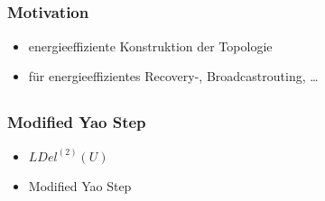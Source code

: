 \documentclass[compress]{beamer}
\begin{document}
\subsection{}
\begin{frame}
\frametitle{Motivation}
\begin{itemize}  %
	\item energieeffiziente Konstruktion der Topologie
	\item für energieeffizientes Recovery-, Broadcastrouting, \ldots
\end{itemize}
\end{frame}
\subsection{}
\begin{frame}
\frametitle{Modified Yao Step}
	\begin{itemize}
		\item $LDel^{(2)}(U) $
		\item Modified Yao Step 
	\end{itemize}
\end{frame}
\end{document}
